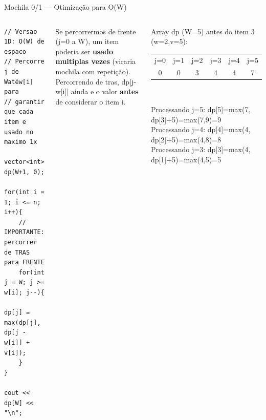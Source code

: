 \documentclass[aspectratio=169,10pt]{beamer}
\newcommand{\cDP}[1]{%
  \cellcolor{cellBase}\footnotesize #1}
\begin{document}
\begin{frame}[fragile,shrink=3]{Mochila 0/1 --- Otimização para O(W)}
  \begin{columns}[t]
      \begin{tcolorbox}[caixaCodigo]
        \begin{lstlisting}[style=cppstyle]
// Versao 1D: O(W) de espaco
// Percorre j de Watéw[i] para
// garantir que cada item e usado no maximo 1x

vector<int> dp(W+1, 0);

for(int i = 1; i <= n; i++){
    // IMPORTANTE: percorrer de TRAS para FRENTE
    for(int j = W; j >= w[i]; j--){
        dp[j] = max(dp[j], dp[j - w[i]] + v[i]);
    }
}

cout << dp[W] << "\n";
        \end{lstlisting}
      \end{tcolorbox}
      \vspace{0.08cm}
      \begin{tcolorbox}[caixaVermelho,title={Por que de tras para frente?}]
        \footnotesize
        Se percorrermos de frente (j=0 a W),
        um item poderia ser \textbf{usado multiplas vezes}
        (viraria mochila com repetição).\\[3pt]
        Percorrendo de tras, dp[j-w[i]] ainda
        e o valor \textbf{antes} de considerar o item i.
      \end{tcolorbox}
      \begin{tcolorbox}[caixaTeal,title={Visualização}]
        \footnotesize
        Array dp (W=5) antes do item 3 (w=2,v=5):\\[4pt]
        \centering
        \begin{tabular}{cccccc}
          \scriptsize j=0 & \scriptsize j=1 & \scriptsize j=2 &
          \scriptsize j=3 & \scriptsize j=4 & \scriptsize j=5\\
          \cDP{0} & \cDP{0} & \cDP{3} & \cDP{4} & \cDP{4} & \cDP{7}\\
        \end{tabular}\\[5pt]
        \raggedright
        Processando j=5: dp[5]=max(7, dp[3]+5)=max(7,9)=9\\
        Processando j=4: dp[4]=max(4, dp[2]+5)=max(4,8)=8\\
        Processando j=3: dp[3]=max(4, dp[1]+5)=max(4,5)=5\\[5pt]

\end{tcolorbox}
\end{columns}
\end{frame}
\end{document}
